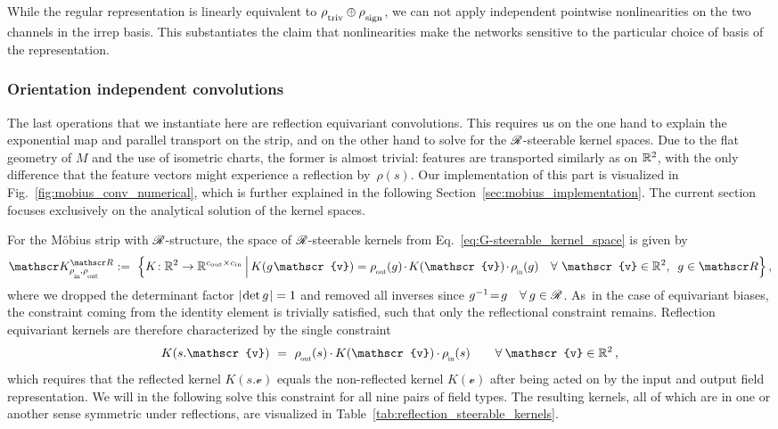 While the regular representation is linearly equivalent to $\rho_{\overset{}{\textup{triv}}}\oplus\rho_{\overset{}{\textup{sign}}}$, we can not apply independent pointwise nonlinearities on the two channels in the irrep basis.
This substantiates the claim that nonlinearities make the networks sensitive to the particular choice of basis of the representation.








\subsubsection{Orientation independent convolutions}
\label{sec:mobius_kernel_spaces}

The last operations that we instantiate here are reflection equivariant convolutions.
This requires us on the one hand to explain the exponential map and parallel transport on the strip, and on the other hand to solve for the $\mathscr{R}$-steerable kernel spaces.
Due to the flat geometry of $M$ and the use of isometric charts, the former is almost trivial:
features are transported similarly as on $\mathbb{R}^2$, with the only difference that the feature vectors might experience a reflection by~$\rho(s)$.
Our implementation of this part is visualized in Fig.~\ref{fig:mobius_conv_numerical}, which is further explained in the following Section~\ref{sec:mobius_implementation}.
The current section focuses exclusively on the analytical solution of the kernel spaces.

For the M\"obius strip with $\mathscr{R}$-structure, the space of $\mathscr{R}$-steerable kernels from Eq.~\eqref{eq:G-steerable_kernel_space} is given by
\begin{align}
    \KR :=\ \Big\{ K\!: \R^2 \to \R^{\cout\times\cin} \,\Big|\,
    K(g\mkern1mu\mathscr{v}) = \rhoout(g) \mkern-2mu\cdot\mkern-2mu K(\mathscr{v}) \mkern-2mu\cdot\mkern-2mu \rhoin(g) \quad \forall\ \mathscr{v} \in \R^2,\,\ g\in \Flip \Big\} \,,
\end{align}
where we dropped the determinant factor $|\mkern-2mu \det g \mkern1mu|=1$ and removed all inverses since ${g^{-1} \!=\! g\ \ \ \forall\mkern4mu g \in \mathscr{R}}$.
As~in the case of equivariant biases, the constraint coming from the identity element is trivially satisfied, such that only the reflectional constraint remains.
Reflection equivariant kernels are therefore characterized by the single constraint
\begin{align}
    K(s.\mathscr{v})\ =\ \rhoout(s) \mkern-1mu\cdot\mkern-1mu K(\mathscr{v}) \mkern-1mu\cdot\mkern-1mu \rhoin(s) \qquad \forall\: \mathscr{v} \in \R^2 \,,
\end{align}
which requires that the reflected kernel $K(s.\mathscr{v})$ equals the non-reflected kernel $K(\mathscr{v})$ after being acted on by the input and output field representation.
We will in the following solve this constraint for all nine pairs of field types.
The resulting kernels, all of which are in one or another sense symmetric under reflections, are visualized in Table~\ref{tab:reflection_steerable_kernels}.

